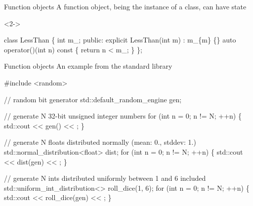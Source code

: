 \begin{frame}[fragile]{Function objects \insertcontinuationtext}
  A function object, being the instance of a class, can have state
  \begin{codeblock}<2->{
class LessThan \{
  \alert<2>{int m\_;}
 public:
  explicit \alert<2>{LessThan(int m) : m\_\{m\} \{\}}
  auto operator()(int n) const \{
    return n < m_;
  \}
\};



}\end{codeblock}


\end{frame}

\begin{frame}[fragile]{Function objects \insertcontinuationtext}
  An example from the standard library

  \begin{codeblock}
#include <random>

// random bit generator
std::default_random_engine gen;

// generate N 32-bit unsigned integer numbers
for (int n = 0; n != N; ++n) \{
  std::cout <{}< \alert{gen()} <{}< \bslashn;
\}

// generate N floats distributed normally (mean: 0., stddev: 1.)
std::normal_distribution<float> dist;
for (int n = 0; n != N; ++n) \{
  std::cout <{}< \alert{dist(gen)} <{}< \bslashn;
\}

// generate N ints distributed uniformly between 1 and 6 included
std::uniform\_int\_distribution<> roll\_dice(1, 6);
for (int n = 0; n != N; ++n) \{
  std::cout <{}< \alert{roll\_dice(gen)} <{}< \bslashn;
\}\end{codeblock}

\end{frame}

